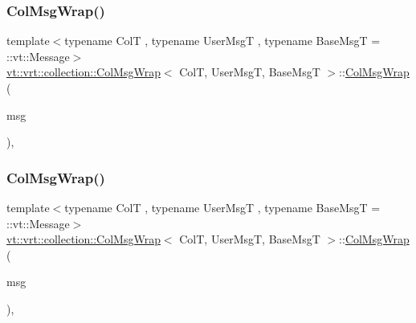 \mbox{\label{structvt_1_1vrt_1_1collection_1_1_col_msg_wrap_a9dfc351adf1f31fda9028608d989ce5c}} 
\subsubsection{\texorpdfstring{Col\+Msg\+Wrap()}{ColMsgWrap()}\hspace{0.1cm}{\footnotesize\ttfamily [2/3]}}
{\footnotesize\ttfamily template$<$typename ColT , typename User\+MsgT , typename Base\+MsgT  = \+::vt\+::\+Message$>$ \\
\hyperlink{structvt_1_1vrt_1_1collection_1_1_col_msg_wrap}{vt\+::vrt\+::collection\+::\+Col\+Msg\+Wrap}$<$ ColT, User\+MsgT, Base\+MsgT $>$\+::\hyperlink{structvt_1_1vrt_1_1collection_1_1_col_msg_wrap}{Col\+Msg\+Wrap} (\begin{DoxyParamCaption}\item[{User\+MsgT \&\&}]{msg }\end{DoxyParamCaption})\hspace{0.3cm}{\ttfamily [inline]}, {\ttfamily [explicit]}}

\mbox{\label{structvt_1_1vrt_1_1collection_1_1_col_msg_wrap_ac19f3573a80a849d41fd5874fe94414a}} 
\subsubsection{\texorpdfstring{Col\+Msg\+Wrap()}{ColMsgWrap()}\hspace{0.1cm}{\footnotesize\ttfamily [3/3]}}
{\footnotesize\ttfamily template$<$typename ColT , typename User\+MsgT , typename Base\+MsgT  = \+::vt\+::\+Message$>$ \\
\hyperlink{structvt_1_1vrt_1_1collection_1_1_col_msg_wrap}{vt\+::vrt\+::collection\+::\+Col\+Msg\+Wrap}$<$ ColT, User\+MsgT, Base\+MsgT $>$\+::\hyperlink{structvt_1_1vrt_1_1collection_1_1_col_msg_wrap}{Col\+Msg\+Wrap} (\begin{DoxyParamCaption}\item[{User\+MsgT const \&}]{msg }\end{DoxyParamCaption})\hspace{0.3cm}{\ttfamily [inline]}, {\ttfamily [explicit]}}



